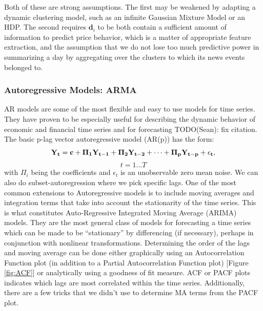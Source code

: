 Both of these are strong assumptions. The first may be weakened by adapting a dynamic clustering model, such as an infinite Gaussian Mixture Model or an HDP. The second requires $\textbf{d}_i$ to be both contain a sufficient amount of information to predict price behavior, which is a matter of appropriate feature extraction, and the assumption that we do not lose too much predictive power in summarizing a day by aggregating over the clusters to which its news events belonged to.

\subsubsection{Autoregressive Models: ARMA}
AR models are some of the most flexible and easy to use models for time series. They have proven to be especially useful for describing the dynamic behavior of economic and financial time series and for forecasting \cite{tsay, VAR} TODO(Sean): fix citation. \\
The basic p-lag vector autoregressive model (AR(p)) has the form: $$\bf{Y}_t=\bf{c}+\bf{\Pi}_1\bf{Y}_{t-1}+\bf{\Pi}_2\bf{Y}_{t-2}+\cdots+\bf{\Pi}_p\bf{Y}_{t-p}+\epsilon_t,$$ $$t=1\ldots T$$ with $\Pi_i$ being the coefficients and $\epsilon_t$ is an unobservable zero mean noise. We can also do subset-autoregression where we pick specific lags.
One of the most common extensions to Autoregressive models is to include moving averages and integration terms that take into account the stationarity of the time series. This is what constitutes Auto-Regressive Integrated Moving Average (ARIMA) models. They are  the most general class of models for forecasting a time series which can be made to be “stationary” by differencing (if necessary), perhaps in conjunction with nonlinear transformations. 
Determining the order of the lags and moving average can be done either graphically using an Autocorrelation Function plot (in addition to a Partial Autocorrelation Function plot) [Figure \ref{fig:ACF}] or analytically using a goodness of fit measure. ACF or PACF plots indicates which lags are most correlated within the time series. Additionally, there are a few tricks that we didn't use to determine MA terms from the PACF plot.
